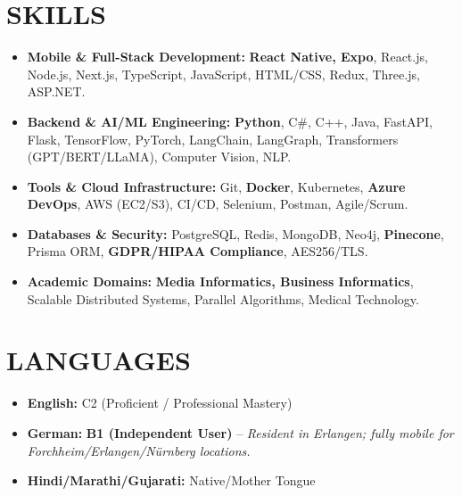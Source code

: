 \documentclass[10pt, a4paper]{article}
\begin{document}
\section{SKILLS}
\begin{itemize}
    \item \textbf{Mobile \& Full-Stack Development:} \textbf{React Native, Expo}, React.js, Node.js, Next.js, TypeScript, JavaScript, HTML/CSS, Redux, Three.js, ASP.NET.
    \item \textbf{Backend \& AI/ML Engineering:} \textbf{Python}, C\#, C++, Java, FastAPI, Flask, TensorFlow, PyTorch, LangChain, LangGraph, Transformers (GPT/BERT/LLaMA), Computer Vision, NLP.
    \item \textbf{Tools \& Cloud Infrastructure:} Git, \textbf{Docker}, Kubernetes, \textbf{Azure DevOps}, AWS (EC2/S3), CI/CD, Selenium, Postman, Agile/Scrum.
    \item \textbf{Databases \& Security:} PostgreSQL, Redis, MongoDB, Neo4j, \textbf{Pinecone}, Prisma ORM, \textbf{GDPR/HIPAA Compliance}, AES256/TLS.
    \item \textbf{Academic Domains:} \textbf{Media Informatics, Business Informatics}, Scalable Distributed Systems, Parallel Algorithms, Medical Technology.
\end{itemize}

\section{LANGUAGES}
\begin{itemize}
    \item \textbf{English:} C2 (Proficient / Professional Mastery)
    \item \textbf{German:} \textbf{B1 (Independent User)} -- \textit{Resident in Erlangen; fully mobile for Forchheim/Erlangen/Nürnberg locations.}
    \item \textbf{Hindi/Marathi/Gujarati:} Native/Mother Tongue
\end{itemize}
\end{document}
